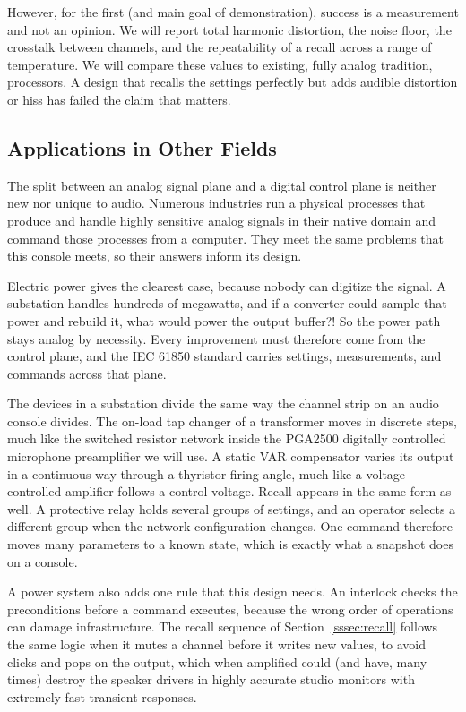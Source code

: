 \documentclass[11pt, letterpaper,titlepage]{article}
\begin{document}
However, for the first (and main goal of demonstration), success is a measurement and not an opinion. We will report total harmonic
distortion, the noise floor, the crosstalk between channels, and the
repeatability of a recall across a range of temperature. We will compare these values to existing, fully analog tradition, processors. A design that recalls the settings
perfectly but adds audible distortion or hiss has failed the claim that matters.

\subsection{Applications in Other Fields}
\label{ssec:other-fields}

The split between an analog signal plane and a digital control plane is neither
new nor unique to audio. Numerous industries run a physical processes that produce and handle highly sensitive analog signals in their native
domain and command those processes from a computer. They meet the same problems
that this console meets, so their answers inform its design.

Electric power gives the clearest case, because nobody can digitize the signal.
A substation handles hundreds of megawatts, and if a converter could sample that power
and rebuild it, what would power the output buffer?! So the power path stays analog by necessity. Every improvement
must therefore come from the control plane, and the IEC 61850 standard carries
settings, measurements, and commands across that plane.

The devices in a substation divide the same way the channel strip on an audio console divides. The
on-load tap changer of a transformer moves in discrete steps, much like the
switched resistor network inside the PGA2500 digitally controlled microphone preamplifier we will use.
A static VAR compensator varies its output in a continuous way through a
thyristor firing angle, much like a voltage controlled amplifier follows a
control voltage. Recall appears in the same form as well. A protective relay
holds several groups of settings, and an operator selects a different group when
the network configuration changes. One command therefore moves many parameters
to a known state, which is exactly what a snapshot does on a console.

A power system also adds one rule that this design needs. An interlock checks
the preconditions before a command executes, because the wrong order of
operations can damage infrastructure. The recall sequence of Section~\ref{sssec:recall}
follows the same logic when it mutes a channel before it writes new values, to avoid clicks and pops on the output, which when amplified could (and have, many times) destroy the speaker drivers in highly accurate studio monitors with extremely fast transient responses.
\end{document}

